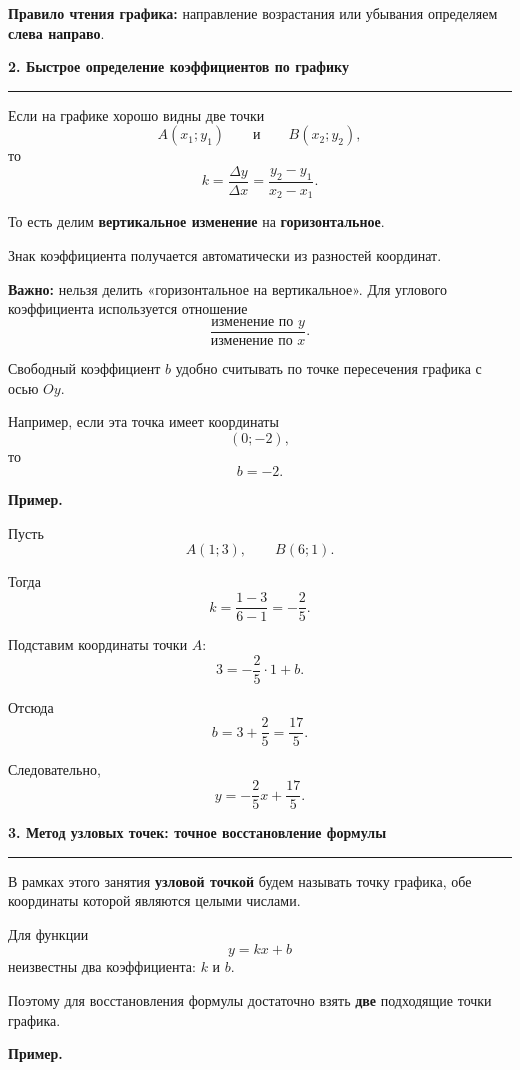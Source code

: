 \documentclass[a4paper,12pt]{article}
\newcommand{\topic}[1]{%
    \vspace{0.5em}%
    {\Large\bfseries\color{darkaccent}#1}%
    \par\vspace{0.35em}%
    {\color{softgray}\rule{\linewidth}{0.7pt}}%
    \vspace{0.45em}%
}
\begin{document}
\textbf{Правило чтения графика:}
направление возрастания или убывания определяем
\textbf{слева направо}.


\topic{2. Быстрое определение коэффициентов по графику}

Если на графике хорошо видны две точки
\[
    A(x_1;y_1)
    \qquad\text{и}\qquad
    B(x_2;y_2),
\]
то
\[
    k=
    \frac{\Delta y}{\Delta x}
    =
    \frac{y_2-y_1}{x_2-x_1}.
\]

То есть делим
\textbf{вертикальное изменение}
на
\textbf{горизонтальное}.

Знак коэффициента получается автоматически
из разностей координат.

\textbf{Важно:}
нельзя делить «горизонтальное на вертикальное».
Для углового коэффициента используется отношение
\[
    \frac{\text{изменение по }y}
         {\text{изменение по }x}.
\]

Свободный коэффициент $b$ удобно считывать
по точке пересечения графика с осью $Oy$.

Например, если эта точка имеет координаты
\[
    (0;-2),
\]
то
\[
    b=-2.
\]

\textbf{Пример.}

Пусть
\[
    A(1;3),
    \qquad
    B(6;1).
\]

Тогда
\[
    k=
    \frac{1-3}{6-1}
    =
    -\frac25.
\]

Подставим координаты точки $A$:
\[
    3=
    -\frac25\cdot1+b.
\]

Отсюда
\[
    b=
    3+\frac25
    =
    \frac{17}{5}.
\]

Следовательно,
\[
    \boxed{
        y=-\frac25x+\frac{17}{5}
    }.
\]


\topic{3. Метод узловых точек: точное восстановление формулы}

В рамках этого занятия
\textbf{узловой точкой}
будем называть точку графика,
обе координаты которой являются целыми числами.

Для функции
\[
    y=kx+b
\]
неизвестны два коэффициента:
$k$ и $b$.

Поэтому для восстановления формулы достаточно
взять \textbf{две} подходящие точки графика.

\textbf{Пример.}
\end{document}
